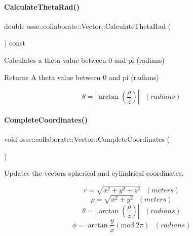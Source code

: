 \paragraph{\texorpdfstring{Calculate\+Theta\+Rad()}{CalculateThetaRad()}}
{\footnotesize\ttfamily double osse\+::collaborate\+::\+Vector\+::\+Calculate\+Theta\+Rad (\begin{DoxyParamCaption}{ }\end{DoxyParamCaption}) const}



Calculates a theta value between 0 and pi (radians) 

\begin{DoxyReturn}{Returns}
A theta value between 0 and pi (radians)
\end{DoxyReturn}
\[ \theta = \left\lvert\arctan{\left(\frac{\rho}{z}\right)}\right\rvert ~~~(radians) \] \mbox{\label{classosse_1_1collaborate_1_1_vector_a427667ec4887828003c2d3652462ad94}} 
\paragraph{\texorpdfstring{Complete\+Coordinates()}{CompleteCoordinates()}}
{\footnotesize\ttfamily void osse\+::collaborate\+::\+Vector\+::\+Complete\+Coordinates (\begin{DoxyParamCaption}{ }\end{DoxyParamCaption})}



Updates the vector\textquotesingle{}s spherical and cylindrical coordinates. 

\[ r = \sqrt{x^2 + y^2 + z^2} ~~~(meters) \] \[ \rho = \sqrt{x^2 + y^2} ~~~(meters) \] \[ \theta = \left\lvert\arctan{\left(\frac{\rho}{z}\right)}\right\rvert ~~~(radians) \] \[ \phi = \arctan{\frac{y}{x}} (\mathrm{mod}\ 2\pi) ~~~(radians) \] \mbox{\label{classosse_1_1collaborate_1_1_vector_a722c3aaf225c4324ff7939bd98827016}} 
